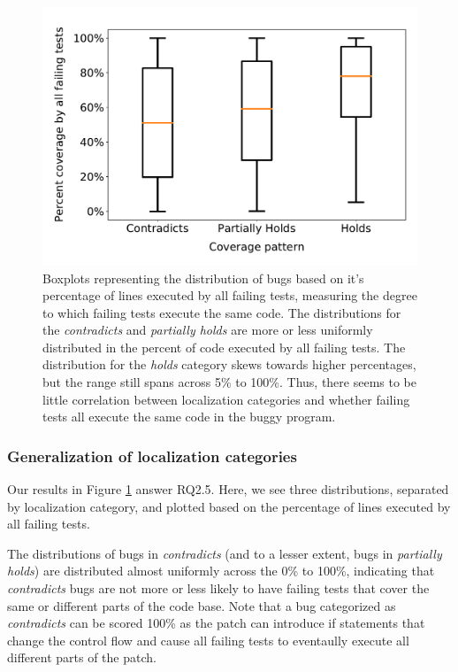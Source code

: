 \documentclass[10pt, conference]{IEEEtran}
\begin{document}
\begin{figure}
	\includegraphics[width=\linewidth,left]{img/coverage-buggy.pdf}
	\caption{Boxplots representing the distribution of bugs based on it's percentage of lines 
	executed by all failing tests, measuring the degree to which failing tests execute the same 
	code. The distributions for the \emph{contradicts} and \emph{partially holds} are more or 
	less uniformly distributed in the percent of code executed by all failing tests. The 
	distribution for the \emph{holds} category skews towards higher percentages, but the range 
	still spans across 5\% to 100\%. Thus, there seems to be little correlation between 
	localization categories and whether failing tests all execute the same code in the buggy 
	program.}
	\label{fig:coverage-buggy}
\end{figure}

\subsubsection{Generalization of localization categories}
Our results in Figure \ref{fig:coverage-buggy} answer RQ2.5. Here, we see three distributions, 
separated by localization category, and plotted based on the percentage of lines executed by all 
failing tests. 

The distributions of bugs in \emph{contradicts} (and to a lesser extent, bugs in \emph{partially 
holds}) are 
distributed almost uniformly across the 0\% to 100\%, indicating that \emph{contradicts} bugs 
are 
not more or less likely to have failing tests that cover the same or different parts of the code 
base. Note that a bug categorized as \emph{contradicts} can be scored 100\% as the 
patch can introduce if statements that change the control flow and cause all failing tests to 
eventaully execute all different parts of the patch.
\end{document}

